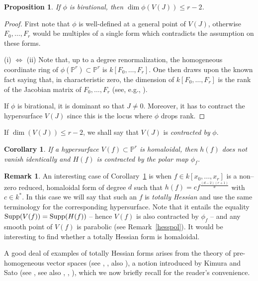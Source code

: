 \documentclass[11pt]{article}   %
\newtheorem{Proposition}[Theorem]{Proposition}
\newtheorem{Corollary}[Theorem]{Corollary}
\theoremstyle{definition}
\newtheorem{Remark}[Theorem]{Remark}
\numberwithin{Theorem}{section} \numberwithin{equation}{section}
\newcommand{\p}{{\mathbb P}}
\begin{document}
{\begin{Proposition}
 If $\phi$ is birational, then $\dim \phi(V(J))\leq r-2$.
\end{Proposition}
\begin{proof}
  First note that $\phi$ is well-defined at a general point of
$V(J)$, otherwise $F_0,\ldots ,F_r$ would be multiples of a single
form which contradicts the assumption on these forms.

(i) $\Leftrightarrow$ (ii) Note that, up to a degree
renormalization, the homogeneous coordinate ring of
$\phi(\p^r)\subset \p^r$ is $k[F_0,\ldots,F_r]$. One then draws upon
the known fact saying that, in characteristic zero, the dimension of
$k[F_0,\ldots,F_r]$ is the rank of the Jacobian matrix of
$F_0,\ldots ,F_r$ (see, e.g., \cite{Simis}).

If $\phi$ is birational, it is dominant so that $J\neq 0$. Moreover,
it has to contract the hypersurface $V(J)$
since this is the locus where $\phi$ drops rank.
\end{proof}

\medskip

If $\dim(V(J))\leq r-2$, we shall say that $V(J)$ is {\it contracted
by\/} $\phi$.
\medskip


\begin{Corollary}\label{shom} If a hypersurface $V(f)\subset \p^ r$
is homaloidal,  then $h(f)$ does not vanish identically and $H(f)$ is contracted by the polar map
$\phi_f$.
\end{Corollary}
\medskip


\begin{Remark}\label{tothess} An interesting case of Corollary~\ref{shom}
is when $f\in k[x_0,...,x_r]$ is a non--zero reduced, homaloidal  form of degree $d$ such
that $h(f)=cf^{\frac {(d-2)(r+1)}d}$ with $c\in k^*$.
In this case we will say that such an $f$ is {\it totally Hessian\/}
and use the same terminology for the corresponding hypersurface.
Note that it entails the equality ${\rm Supp}(V(f))={\rm
Supp}(H(f))$ -- hence $V(f)$ is also contracted by $\phi_f$ -- and
any smooth point of $V(f)$ is parabolic (see Remark~\ref{hesspol}).
 It would be interesting to find whether a totally Hessian form is
 homaloidal.

 A good deal of examples of totally Hessian forms
arises from the theory of pre-homogeneous vector spaces (see
\cite{Segre}, \cite{Segre2}, also \cite{Mukai}), a notion introduced
by Kimura and Sato (see \cite{KS}, see also \cite {ESB}, \cite
{Dolgachev}, \cite {EKP}), which we now briefly recall for the
reader's convenience.


\end{Remark}}
\end{document}
